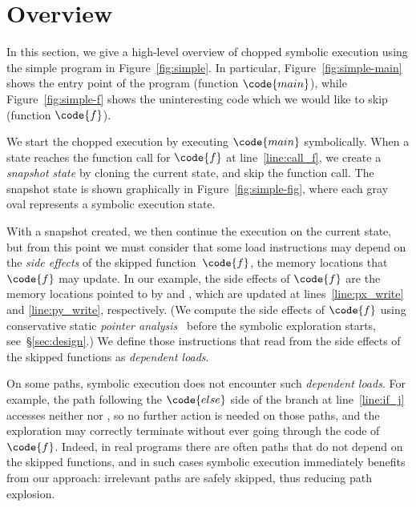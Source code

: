 

\chapter{Overview}\label{chapter:overview}

In this section, we give a high-level overview of chopped symbolic
execution using the simple program in Figure~\ref{fig:simple}. In
particular, Figure~\ref{fig:simple-main} shows the entry point of the
program (function $\code{main}$), while Figure~\ref{fig:simple-f}
shows the uninteresting code which we would like to skip (function
$\code{f}$).

We start the chopped execution by executing $\code{main}$
symbolically. When a state reaches the function call for $\code{f}$ at
line~\ref{line:call_f}, we create a \textit{snapshot state} by cloning
the current state, and skip the function call. The snapshot state is
shown graphically in Figure~\ref{fig:simple-fig}, where each gray oval
represents a symbolic execution state.

With a snapshot created, we then continue the execution on the current
state, but from this point we must consider that some load
instructions may depend on the \textit{side effects} of the skipped
function~$\code{f}$, \ie the memory locations that $\code{f}$ may
update. In our example, the side effects of $\code{f}$ are the memory
locations pointed to by  and , which are updated
at lines~\ref{line:px_write} and \ref{line:py_write}, respectively.
(We compute the side effects of $\code{f}$ using conservative static
\emph{pointer analysis}~\cite{andersen:pointeranalysis,
  Hind:Paste2001, Smaragdakis:FTPL2015} before the symbolic
exploration starts, see~\S\ref{sec:design}.) We define those
instructions that read from the side effects of the skipped functions
as \textit{dependent loads}.

On some paths, symbolic execution does not encounter such
\textit{dependent loads}. For example, the path following the
$\code{else}$ side of the branch at line~\ref{line:if_j} accesses
neither  nor , so no further action is needed on
those paths, and the exploration may correctly terminate without ever
going through the code of $\code{f}$. Indeed, in real programs there
are often paths that do not depend on the skipped functions, and in
such cases symbolic execution immediately benefits from our approach:
irrelevant paths are safely skipped, thus reducing path explosion.

